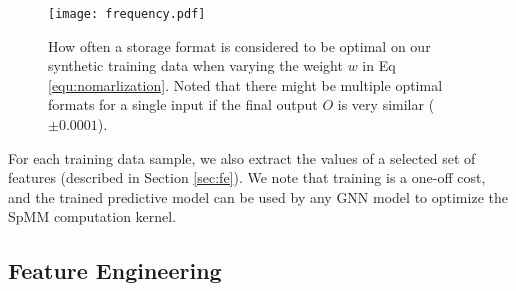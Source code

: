 \begin{figure}[t!]
\centering
\texttt{[image: frequency.pdf]}
\vspace{-5mm}
\caption{How often a storage format is considered to be optimal on our synthetic training data when varying the weight $w$ in Eq \ref{equ:nomarlization}. Noted that there might be multiple optimal formats for a single input if the final output $O$ is very similar ($\pm 0.0001$). }
\label{fig:frequency}
\vspace{-4mm}
\end{figure}

 For each training data
sample, we also extract the values of a selected set of features (described in Section \ref {sec:fe}). We note that training is a one-off cost, and the trained predictive model can be used by any GNN model to optimize the SpMM computation kernel.

\vspace{-2mm}
\subsection{Feature Engineering\label{sec:fe}}
\vspace{-2mm}

